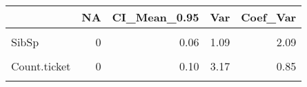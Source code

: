 \documentclass[
]{article}
\begin{document}
\begin{table}
\centering
\begin{tabular}[t]{lrrrr}
\toprule
  & NA & CI\_Mean\_0.95 & Var & Coef\_Var\\
\midrule
\cellcolor{gray!6}{Age} & \cellcolor{gray!6}{0} & \cellcolor{gray!6}{0.75} & \cellcolor{gray!6}{192.67} & \cellcolor{gray!6}{0.47}\\
SibSp & 0 & 0.06 & 1.09 & 2.09\\
\cellcolor{gray!6}{Parch} & \cellcolor{gray!6}{0} & \cellcolor{gray!6}{0.05} & \cellcolor{gray!6}{0.75} & \cellcolor{gray!6}{2.25}\\
Count.ticket & 0 & 0.10 & 3.17 & 0.85\\
\cellcolor{gray!6}{Unit.price} & \cellcolor{gray!6}{0} & \cellcolor{gray!6}{0.65} & \cellcolor{gray!6}{143.86} & \cellcolor{gray!6}{0.82}\\
\bottomrule
\end{tabular}
\end{table}

\texttt{}~\\
\texttt{}
\end{document}

